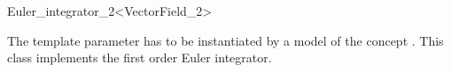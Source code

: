
\begin{ccRefFunctionObjectClass}{Euler_integrator_2<VectorField_2>}  %

\ccDefinition

The template parameter  has to be instantiated by a
model of the concept . This class implements the
first order Euler integrator.


\ccIsModel 

 \\


\ccSeeAlso
{} \\
\end{ccRefFunctionObjectClass}



